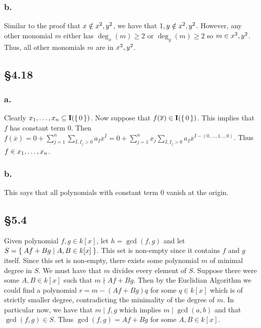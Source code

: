 \documentclass[letterpaper]{article}
\begin{document}
\subsubsection*{b.}

Similar to the proof that $x \notin \ideal{x^{2}, y^{2}}$, we have that $1, y \notin \ideal{x^{2}, y^{2}}$.
However, any other monomial $m$ either has $\deg_{x}(m) \geq 2$ or $\deg_{y}(m) \geq 2$ so $m \in \ideal{x^{2}, y^{2}}$.
Thus, all other monomials $m$ are in $\ideal{x^{2}, y^{2}}$.

\subsection*{\S 4.18}

\subsubsection*{a.}

Clearly $\ideal{x_{1}, \ldots, x_{n}} \subseteq \mathbf{I}(\set{0})$.
Now suppose that $f(\overline{x}) \in \mathbf{I}(\set{0})$.
This implies that $f$ has constant term $0$.
Then $f(\overline{x}) = 0 + \sum_{j = 1}^{n} \sum_{\overline{I}, I_{j} > 0} a_{\overline{I}} \overline{x}^{\overline{I}} = 0 + \sum_{j = 1}^{n} x_{j} \sum_{\overline{I}, I_{j} > 0} a_{\overline{I}} \overline{x}^{\overline{I} - (0, \ldots, 1, \ldots 0)}$.
Thus $f \in \ideal{x_{1}, \ldots, x_{n}}$.

\subsubsection*{b.}

This says that all polynomials with constant term $0$ vanish at the origin.

\subsection*{\S 5.4}

Given polynomial $f, g \in k[x]$, let $h = \gcd(f, g)$ and let $S = \Set{Af + Bg | A, B \in k[x]}$.
This set is non-empty since it contains $f$ and $g$ itself.
Since this set is non-empty, there exists some polynomial $m$ of minimal degree in $S$.
We must have that $m$ divides every element of $S$.
Suppose there were some $A, B \in k[x]$ such that $m \nmid Af + Bg$.
Then by the Euclidian Algorithm we could find a polynomial $r = m - (Af + Bg)q$ for some $q \in k[x]$ which is of strictly smaller degree, contradicting the minimality of the degree of $m$.
In particular now, we have that $m \mid f, g$ which implies $m \mid \gcd(a, b)$ and that $\gcd(f, g) \in S$.
Thus $\gcd(f, g) = Af + Bg$ for some $A, B \in k[x]$.
\end{document}
